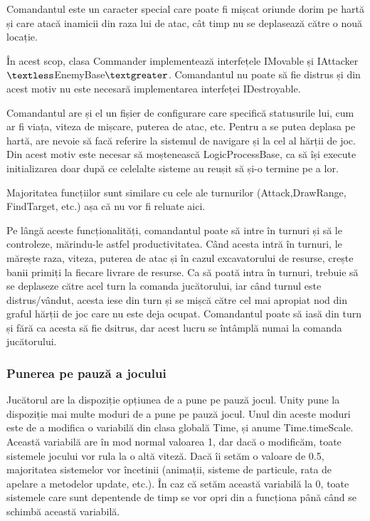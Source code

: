\documentclass[12pt, a4paper]{article}
\begin{document}
	Comandantul este un caracter special care poate fi mișcat oriunde dorim pe hartă și care atacă inamicii din raza lui de atac, cât timp nu se deplasează către o nouă locație.
	\newline
	
	În acest scop, clasa Commander implementează interfețele IMovable și IAttacker$\textless$EnemyBase$\textgreater$. Comandantul nu poate să fie distrus și din acest motiv nu este necesară implementarea interfeței IDestroyable.
	\newline
	
	Comandantul are și el un fișier de configurare care specifică statusurile lui, cum ar fi viața, viteza de mișcare, puterea de atac, etc. Pentru a se putea deplasa pe hartă, are nevoie să facă referire la sistemul de navigare și la cel al hărții de joc. Din acest motiv este necesar să moștenească LogicProcessBase, ca să își execute initializarea doar după ce celelalte sisteme au reușit să și-o termine pe a lor.
	\newline
	
	Majoritatea funcțiilor sunt similare cu cele ale turnurilor (Attack,\newline DrawRange, FindTarget, etc.) așa că nu vor fi reluate aici. 
	\newline
	
	Pe lângă aceste funcționalități, comandantul poate să intre în turnuri și să le controleze, mărindu-le astfel productivitatea. Când acesta intră în turnuri, le mărește raza, viteza, puterea de atac și în cazul excavatorului de resurse, crește banii primiți la fiecare livrare de resurse. Ca să poată intra în turnuri, trebuie să se deplaseze către acel turn la comanda jucătorului, iar când turnul este distrus/vândut, acesta iese din turn și se mișcă către cel mai apropiat nod din graful hărții de joc care nu este deja ocupat. Comandantul poate să iasă din turn și fără ca acesta să fie dsitrus, dar acest lucru se întâmplă numai la comanda jucătorului.
	
	
	
	
	
	\subsubsection{Punerea pe pauză a jocului}
	
	Jucătorul are la dispoziție opțiunea de a pune pe pauză jocul. Unity pune la dispoziție mai multe moduri de a pune pe pauză jocul. Unul din aceste moduri este de a modifica o variabilă din clasa globală Time, și anume Time.timeScale. Această variabilă are în mod normal valoarea 1, dar dacă o modificăm, toate sistemele jocului vor rula la o altă viteză. Dacă îi setăm o valoare de 0.5, majoritatea sistemelor vor încetinii (animații, sisteme de particule, rata de apelare a metodelor update, etc.). În caz că setăm această variabilă la 0, toate sistemele care sunt depentende de timp se vor opri din a funcționa până când se schimbă această variabilă. 
	\newline
	
\end{document}
